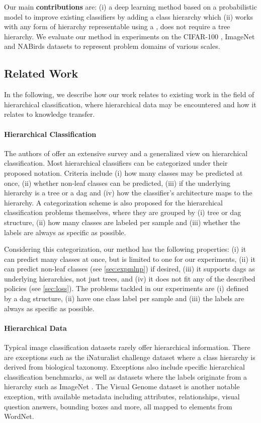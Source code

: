 \documentclass[10pt,twocolumn,letterpaper]{article}
\begin{document}
Our main \textbf{contributions} are: (i) a deep learning method based on a probabilistic model to improve existing classifiers by adding a
class hierarchy which (ii) works with any form of hierarchy representable using a
, \ie does not require a tree hierarchy. We evaluate our method in
experiments on the CIFAR-100 \cite{Krizhevsky2009CIFAR}, ImageNet and NABirds \cite{VanHorn2015NAB} datasets to represent problem
domains of various scales.




\subsection{Related Work}
In the following, we describe how our work relates to existing work in the field
of hierarchical classification, where hierarchical data may be encountered
and how it relates to knowledge transfer.
\paragraph{Hierarchical Classification}
The authors of \cite{Silla2011HClass} offer an extensive survey and a generalized view on hierarchical classification.
Most hierarchical classifiers can be categorized under their proposed notation. Criteria
include (i) how many classes may be predicted at once, (ii) whether non-leaf classes can be
predicted, (iii) if the underlying hierarchy is a tree or a \gls{dag} and (iv)
how the classifier's architecture maps to the hierarchy. A categorization scheme is also
proposed for the hierarchical classification problems themselves, where they are grouped by
(i) tree or \gls{dag} structure, (ii) how many classes are labeled per sample and (iii) whether
the labels are always as specific as possible.

Considering this categorization, our method has the following properties: (i) it can predict
many classes at once, but is limited to one for our experiments, (ii) it can predict
non-leaf classes (see \cref{sec:expmlnp}) if desired, (iii) it supports \glspl{dag} as underlying
hierarchies, not just trees, and (iv) it does not fit any of the described policies (see \cref{sec:loss}).
The problems tackled in our experiments are (i) defined by a \gls{dag} structure, (ii) have
one class label per sample and (iii) the labels are always as specific as possible.


\paragraph{Hierarchical Data}
Typical image classification datasets rarely offer hierarchical information. There are exceptions
such as the iNaturalist challenge dataset \cite{VanHorn2017iNat} where a class hierarchy is
derived from biological taxonomy. Exceptions also include specific hierarchical classification
benchmarks, \eg \cite{Partalas2015LSHTC,Torralba2008Tiny} as well as datasets where the labels
originate from a hierarchy such as ImageNet \cite{Deng2009ImageNet}.
The Visual Genome dataset \cite{Krishna2017VG} is another notable exception, with available metadata
including attributes, relationships, visual question answers, bounding boxes and more, all
mapped to elements from WordNet.
\end{document}
